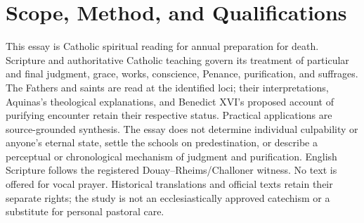 \section{Scope, Method, and Qualifications}
This essay is Catholic spiritual reading for annual preparation for death. Scripture and authoritative Catholic teaching govern its treatment of particular and final judgment, grace, works, conscience, Penance, purification, and suffrages. The Fathers and saints are read at the identified loci; their interpretations, Aquinas's theological explanations, and Benedict XVI's proposed account of purifying encounter retain their respective status. Practical applications are source-grounded synthesis. The essay does not determine individual culpability or anyone's eternal state, settle the schools on predestination, or describe a perceptual or chronological mechanism of judgment and purification. English Scripture follows the registered Douay--Rheims/Challoner witness. No text is offered for vocal prayer. Historical translations and official texts retain their separate rights; the study is not an ecclesiastically approved catechism or a substitute for personal pastoral care.
